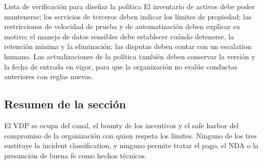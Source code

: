 \begin{importantbox}{Lista de verificación para diseñar la política}
El inventario de activos debe poder mantenerse; los servicios de terceros deben indicar los límites de propiedad; las restricciones de velocidad de prueba y de automatización deben explicar su motivo; el manejo de datos sensibles debe establecer cuándo detenerse, la retención mínima y la eliminación; las disputas deben contar con un escalation humano. Las actualizaciones de la política también deben conservar la versión y la fecha de entrada en vigor, para que la organización no evalúe conductas anteriores con reglas nuevas.
\end{importantbox}

\subsection{Resumen de la sección}

El VDP se ocupa del canal, el bounty de los incentivos y el safe harbor del compromiso de la organización con quien respeta los límites. Ninguno de los tres sustituye la incident classification, y ninguno permite tratar el pago, el NDA o la presunción de buena fe como hechos técnicos.
